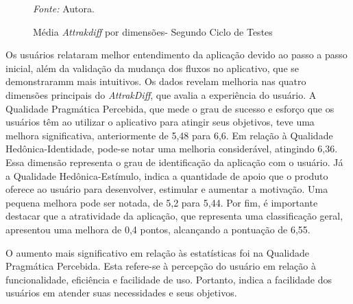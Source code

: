 \begin{figure}[h!]
	\centering
	\caption{Média \textit{Attrakdiff} por dimensões- Segundo Ciclo de Testes}
	\begin{tablenotes}[flushleft]
		\centering
		\item \textit{Fonte:} Autora.
	\end{tablenotes}
	\label{fig27}
\end{figure}

Os usuários relataram melhor entendimento da aplicação devido ao passo a passo inicial, além da validação da mudança dos fluxos no aplicativo, que se demonstraramm mais intuitivos. Os dados revelam melhoria nas quatro dimensões principais do \textit{AttrakDiff}, 
que avalia a experiência do usuário. A Qualidade Pragmática Percebida, que mede o grau de sucesso e esforço que os usuários têm ao utilizar o aplicativo para atingir seus objetivos, teve uma melhora significativa, anteriormente de 5,48 para 6,6. Em relação à 
Qualidade Hedônica-Identidade, pode-se notar uma melhoria considerável, atingindo 6,36. Essa dimensão representa o grau de identificação da aplicação com o usuário. Já a Qualidade Hedônica-Estímulo, indica a quantidade de apoio que o produto oferece ao usuário 
para desenvolver, estimular e aumentar a motivação. Uma pequena melhora pode ser notada, de 5,2 para 5,44. Por fim, é importante destacar que a atratividade da aplicação, que representa uma classificação geral, apresentou uma melhora de 0,4 pontos, alcançando a 
pontuação de 6,55.

O aumento mais significativo em relação às estatísticas foi na Qualidade Pragmática Percebida. Esta refere-se à percepção do usuário em relação à funcionalidade, eficiência e facilidade de uso. Portanto, indica a facilidade dos usuários em atender suas necessidades e 
seus objetivos.

